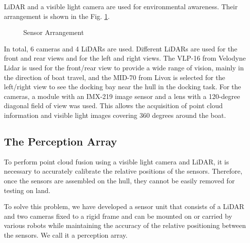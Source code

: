 \documentclass[lettersize,journal]{IEEEtran}
\begin{document}
LiDAR and a visible light camera are used for environmental awareness.
Their arrangement is shown in the Fig. \ref{fig:sensor_arrangement}.

\begin{figure}[H]
  \begin{center}
  \end{center}
  \caption{Sensor Arrangement}
  \label{fig:sensor_arrangement}
\end{figure}

In total, 6 cameras and 4 LiDARs are used.
Different LiDARs are used for the front and rear views and for the left and right views.
The VLP-16 from Velodyne Lidar is used for the front/rear view to provide a wide range of vision, mainly in the direction of boat travel, and the MID-70 from Livox is selected for the left/right view to see the docking bay near the hull in the docking task.
For the cameras, a module with an IMX-219 image sensor and a lens with a 120-degree diagonal field of view was used.
This allows the acquisition of point cloud information and visible light images covering 360 degrees around the boat.

\subsection{The Perception Array}

To perform point cloud fusion using a visible light camera and LiDAR, it is necessary to accurately calibrate the relative positions of the sensors.
Therefore, once the sensors are assembled on the hull, they cannot be easily removed for testing on land.

To solve this problem, we have developed a sensor unit that consists of a LiDAR and two cameras fixed to a rigid frame and can be mounted on or carried by various robots while maintaining the accuracy of the relative positioning between the sensors.
We call it a perception array.
\end{document}
